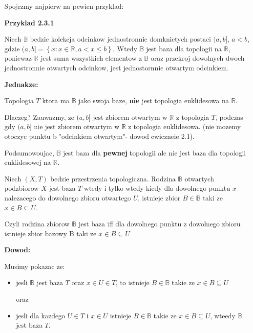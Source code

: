 \documentclass{article}
\begin{document}
Spojrzmy najpierw na pewien przyklad:

\textbf{Przyklad 2.3.1}

Niech $\mathbb{B}$ bedzie kolekcja odcinkow jednostronnie domknietych postaci $(a, b]$, $a<b$, gdzie $(a,b] = \left\{ x: x \in \mathbb{R}, a < x \leq b  \right\}$. Wtedy $\mathbb{B}$ jest baza dla topologii na $\mathbb{R}$, poniewaz $\mathbb{R}$ jest suma wszystkich elementow z $\mathbb{B}$ oraz przekroj dowolnych dwoch jednostronnie otwartych odcinkow, jest jednostornnie otwartym odcinkiem. 

\textbf{Jednakze:}

Topologia $T$ ktora ma $\mathbb{B}$ jako swoja baze, \textbf{nie} jest topologia euklidesowa na $\mathbb{R}$.

Dlaczeg? Zauwazmy, ze $(a,b]$ jest zbiorem otwartym w $\mathbb{R}$ z topologia $T$, podczas gdy $(a,b]$ nie jest zbiorem otwartym w $\mathbb{R}$ z topologia euklidesowa. (nie mozemy otoczyc punktu b "odcinkiem otwartym"- dowod cwiczneie 2.1).

Podsumowoujac, $\mathbb{B}$ jest baza dla \textbf{pewnej} topologii ale nie jest baza dla topologii euklidesowej na $\mathbb{R}$.

\begin{tcolorbox}[colback=white!90!green,colframe=black!35!green,title=2.3.2 Lemat Baza topologii podejscie 2?]

    Niech $(X,T)$ bedzie przestrzenia topologiczna. Rodzina $\mathbb{B}$ otwartych podzbiorow $X$ jest baza $T$ wtedy i tylko wtedy kiedy dla dowolnego punktu $x$ nalezacego do dowolnego zbioru otwartego $U$, istnieje zbior $B \in \mathbb{B}$ taki ze $x \in B \subseteq U$.

    Czyli rodzina zbiorow $\mathbb{B}$ jest baza iff dla dowolnego punktu z dowolnego zbioru istnieje zbior bazowy B taki ze $x \in B \subseteq U$
\end{tcolorbox}

\textbf{Dowod:}

Musimy pokazac ze:
\begin{itemize}
    \item jesli $\mathbb{B}$ jest baza $T$ oraz $x \in U \in T$, to istnieje $B \in \mathbb{B}$ takie ze $x \in B \subseteq U$

        oraz
    \item jesli dla kazdego $U \in T$ i $x \in U$ istnieje $B \in \mathbb{B}$ takie ze $x \in B \subseteq U$, wteedy $\mathbb{B}$ jest baza $T$.
\end{itemize}
\end{document}
